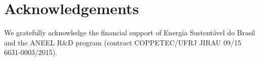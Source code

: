 \section*{Acknowledgements}
We gratefully acknowledge the financial support of Energia Sustentável do
Brasil and the ANEEL R\&D program (contract COPPETEC/UFRJ JIRAU 09/15
6631-0003/2015).
